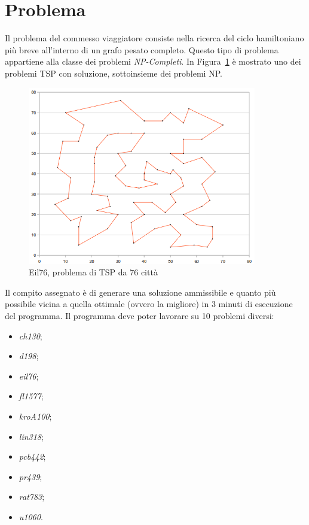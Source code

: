 \chapter*{Problema}
\label{cha_problema}

Il problema del commesso viaggiatore consiste nella ricerca del ciclo hamiltoniano più breve all'interno di un grafo pesato completo. Questo tipo di problema appartiene alla classe dei problemi \emph{NP-Completi}. In Figura~\ref{fig_eil76} è mostrato uno dei problemi TSP con soluzione, sottoinsieme dei problemi NP.

\begin{figure}
  \centering
  \includegraphics[width=10.0cm]{immagini/eil76.png}
  \caption{Eil76, problema di TSP da 76 città\label{fig_eil76}}
\end{figure}

Il compito assegnato è di generare una soluzione ammissibile e quanto più possibile vicina a quella ottimale (ovvero la migliore) in 3 minuti di esecuzione del programma. Il programma deve poter lavorare su 10 problemi diversi:
\begin{itemize}
  \item \emph{ch130};
  \item \emph{d198};
  \item \emph{eil76};
  \item \emph{fl1577};
  \item \emph{kroA100};
  \item \emph{lin318};
  \item \emph{pcb442};
  \item \emph{pr439};
  \item \emph{rat783};
  \item \emph{u1060}.
\end{itemize}

